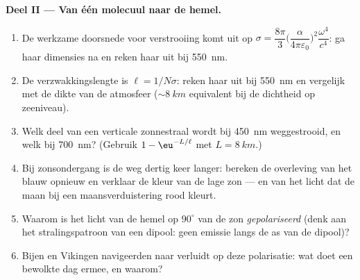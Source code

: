 \begin{problem}
\medskip\noindent\textbf{Deel II --- Van één molecuul naar de
hemel.}
\begin{enumerate}[resume]
  \item De werkzame doorsnede voor verstrooiing komt uit op $\sigma =
        \dfrac{8\pi}{3}\Big(\dfrac{\alpha}{4\pi\varepsilon_0}
        \Big)^2\dfrac{\omega^4}{c^4}$: ga haar dimensies na en reken
        haar uit bij \qty{550}{nm}.
  \item De verzwakkingslengte is $\ell = 1/N\sigma$: reken haar uit bij
        \qty{550}{nm} en vergelijk met de dikte van de atmosfeer
        ($\sim\qty{8}{km}$ equivalent bij de dichtheid op zeeniveau).
  \item Welk deel van een verticale zonnestraal wordt bij \qty{450}{nm}
        weggestrooid, en welk bij \qty{700}{nm}? (Gebruik $1 -
        \eu^{-L/\ell}$ met $L = \qty{8}{km}$.)
  \item Bij zonsondergang is de weg dertig keer langer: bereken de
        overleving van het blauw opnieuw en verklaar de kleur van de lage
        zon --- en van het licht dat de maan bij een maansverduistering
        rood kleurt.
  \item Waarom is het licht van de hemel op $90^\circ$ van de zon
        \emph{gepolariseerd} (denk aan het stralingspatroon van een
        dipool: geen emissie langs de as van de dipool)?
  \item Bijen en Vikingen navigeerden naar verluidt op deze polarisatie:
        wat doet een bewolkte dag ermee, en waarom?
\end{enumerate}


\end{problem}
